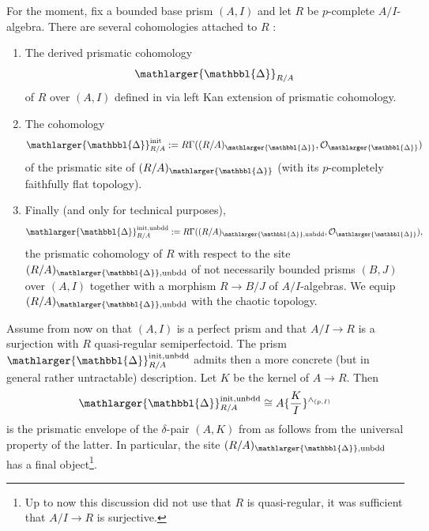 \documentclass{amsart}
\newcommand{\prism}{{\mathlarger{\mathbbl{\Delta}}}}
\theoremstyle{plain}
\newtheorem{lemma}[theorem]{Lemma}
\theoremstyle{definition}
\begin{document}
For the moment, fix a bounded base prism $(A,I)$ and let $R$ be $p$-complete $A/I$-algebra. There are several cohomologies attached to $R$ :
\begin{enumerate}
\item The derived prismatic cohomology
$$
\prism_{R/A}
$$
of $R$ over $(A,I)$ defined in  via left Kan extension of prismatic cohomology.
\item The cohomology
$$
\prism_{R/A}^{\mathrm{init}}:=R\Gamma((R/A)_{\prism},\mathcal{O}_\prism)
$$
of the prismatic site of $(R/A)_\prism$ (with its $p$-completely faithfully flat topology). 
\item Finally (and only for technical purposes),
$$
\prism_{R/A}^{\mathrm{init, unbdd}}:=R\Gamma((R/A)_{\prism,\mathrm{unbdd}},\mathcal{O}_\prism),
$$
the prismatic cohomology of $R$ with respect to the site $(R/A)_{\prism,\mathrm{unbdd}}$ of not necessarily bounded prisms $(B,J)$ over $(A,I)$ together with a morphism $R\to B/J$ of $A/I$-algebras. We equip $(R/A)_{\prism,\mathrm{unbdd}}$ with the chaotic topology.
\end{enumerate}
%

Assume from now on that $(A,I)$ is a perfect prism and that $A/I\to R$ is a surjection with $R$ quasi-regular semiperfectoid.
The prism $\prism_{R/A}^{\mathrm{init, unbdd}}$ admits then a more concrete (but in general rather untractable) description. Let $K$ be the kernel of $A\to R$. Then
$$
\prism_{R/A}^{\mathrm{init, unbdd}}\cong A\{\frac{K}{I}\}^{\wedge_{(p,I)}}
$$
is the prismatic envelope of the $\delta$-pair $(A,K)$ from \cite[Lemma V.5.1]{bhatt_lectures_on_prismatic_cohomology} as follows from the universal property of the latter. In particular, the site $(R/A)_{\prism,\mathrm{unbdd}}$ has a final object\footnote{Up to now this discussion did not use that $R$ is quasi-regular, it was sufficient that $A/I\to R$ is surjective.}.
\end{document}
